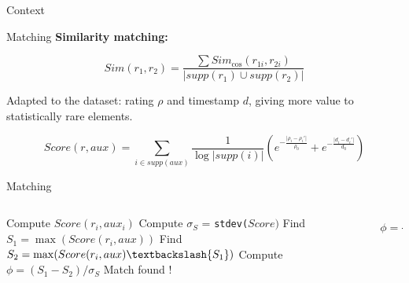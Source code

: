 \begin{frame}{Context}
	
\end{frame}


\begin{frame}{Matching}
	\textbf{Similarity matching:}

	\begin{equation*}
	Sim(r_1, r_2) = \frac{\sum Sim_{\text{cos}}(r_{1i}, r_{2i})}{\lvert supp(r_1) \cup supp(r_2) \rvert}
	\end{equation*} 

	Adapted to the dataset: rating $\rho$ and timestamp $d$, giving more value to statistically rare elements.

	\begin{equation*}
	Score(r,aux) = \sum_{i \in supp(aux)} \frac{1}{\log\lvert supp(i) \rvert} \left( e^{-\frac{ \lvert \rho_i - \rho_i'  \rvert}{\rho_0}} + e^{-\frac{\lvert d_i - d_i' \rvert}{d_0}}\right)
	\end{equation*}
\end{frame}

\begin{frame}{Matching}	
	\begin{columns}
		\begin{column}{.6\linewidth}
			
		\begin{algorithmic}[1]
		\State Compute $Score(r_i,aux_i)$
		\EndFor
		\State Compute $\sigma_S$ = \texttt{stdev(}$Score\texttt{)}$
		\State Find $S_1 = \max(Score(r_i, aux))$
		\State Find $S_2 = \max(Score(r_i, aux) \textbackslash \{S_1\})$
		\State Compute $\phi = (S_1-S_2)/\sigma_S$
		\State Match found !
		\EndIf
		\EndFor
	\end{algorithmic}
		\end{column}
	\begin{column}{.4\linewidth}
		\begin{equation*}
		\phi = \frac{S_1-S_2}{\sigma_S}
		\end{equation*}
		
	\end{column}
	\end{columns}

\end{frame}


